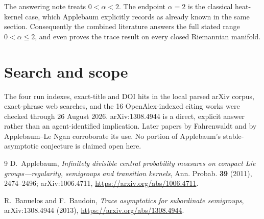 \documentclass[11pt]{article}
\begin{document}
The answering note treats $0<\alpha<2$.  The endpoint $\alpha=2$ is the
classical heat-kernel case, which Applebaum explicitly records as already
known in the same section.  Consequently the combined literature answers the
full stated range $0<\alpha\leq2$, and even proves the trace result on every
closed Riemannian manifold.

\section*{Search and scope}

The four run indexes, exact-title and DOI hits in the local parsed arXiv
corpus, exact-phrase web searches, and the 16 OpenAlex-indexed citing works
were checked through 26 August 2026.  arXiv:1308.4944 is a direct, explicit
answer rather than an agent-identified implication.  Later papers by
Fahrenwaldt and by Applebaum--Le Ngan corroborate its use.  No portion of
Applebaum's stable-asymptotic conjecture is claimed open here.

\begin{thebibliography}{9}
D.~Applebaum,
\emph{Infinitely divisible central probability measures on compact Lie
groups---regularity, semigroups and transition kernels},
Ann. Probab. \textbf{39} (2011), 2474--2496;
arXiv:1006.4711,
\url{https://arxiv.org/abs/1006.4711}.

R.~Banuelos and F.~Baudoin,
\emph{Trace asymptotics for subordinate semigroups},
arXiv:1308.4944 (2013),
\url{https://arxiv.org/abs/1308.4944}.
\end{thebibliography}
\end{document}
